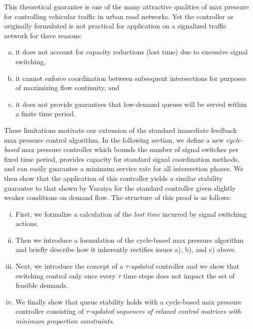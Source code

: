 This theoretical guarantee is one of the many attractive qualities of max pressure for controlling vehicular traffic in urban road networks. Yet the controller as originally formulated is not practical for application on a signalized traffic network for three reasons:
\begin{enumerate}[a)]
\item it does not account for capacity reductions (lost time) due to excessive signal switching, 
\item it cannot enforce coordination between subsequent intersections for purposes of maximizing flow continuity, and
\item it does not provide guarantees that low-demand queues will be served within a finite time period. 
\end{enumerate} 
These limitations motivate our extension of the standard immediate feedback max pressure control algorithm. In the following section, we define a new \emph{cycle-based} max pressure controller which bounds the number of signal switches per fixed time period, provides capacity for standard signal coordination methods, and can easily guarantee a minimum service rate for all intersection phases. We then show that the application of this controller yields a similar stability guarantee to that shown by Varaiya for the standard controller given slightly weaker conditions on demand flow. The structure of this proof is as follows: 
\begin{enumerate}[i.]
\item First, we formalize a calculation of the \emph{lost time} incurred by signal switching actions. 
\item Then we introduce a formulation of the cycle-based max pressure algorithm and briefly describe how it inherently rectifies issues a), b), and c) above. 
\item Next, we introduce the concept of a \emph{$\tau$-updated} controller and we show that switching control only once every $\tau$ time steps does not impact the set of feasible demands.  
\item We finally show that queue stability holds with a cycle-based max pressure controller consisting of \emph{$\tau$-updated sequences of relaxed control matrices with minimum proportion constraints}. 
\end{enumerate}


